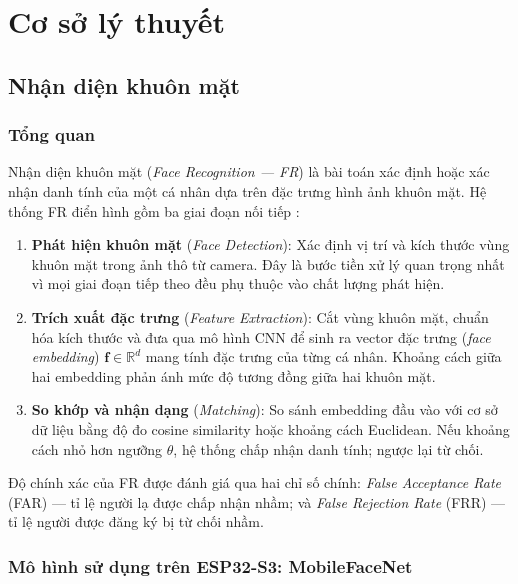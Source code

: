 \chapter{Cơ sở lý thuyết}
\label{chap:theory}

\section{Nhận diện khuôn mặt}
\label{sec:face_recognition}

\subsection{Tổng quan}

Nhận diện khuôn mặt (\textit{Face Recognition --- FR}) là bài toán xác định hoặc xác nhận danh tính của một cá nhân dựa trên đặc trưng hình ảnh khuôn mặt. Hệ thống FR điển hình gồm ba giai đoạn nối tiếp \cite{wang2021}:

\begin{enumerate}[label=\arabic*.]
  \item \textbf{Phát hiện khuôn mặt} (\textit{Face Detection}): Xác định vị trí và kích thước vùng khuôn mặt trong ảnh thô từ camera. Đây là bước tiền xử lý quan trọng nhất vì mọi giai đoạn tiếp theo đều phụ thuộc vào chất lượng phát hiện.
  \item \textbf{Trích xuất đặc trưng} (\textit{Feature Extraction}): Cắt vùng khuôn mặt, chuẩn hóa kích thước và đưa qua mô hình CNN để sinh ra vector đặc trưng (\textit{face embedding}) $\mathbf{f} \in \mathbb{R}^d$ mang tính đặc trưng của từng cá nhân. Khoảng cách giữa hai embedding phản ánh mức độ tương đồng giữa hai khuôn mặt.
  \item \textbf{So khớp và nhận dạng} (\textit{Matching}): So sánh embedding đầu vào với cơ sở dữ liệu bằng độ đo cosine similarity hoặc khoảng cách Euclidean. Nếu khoảng cách nhỏ hơn ngưỡng $\theta$, hệ thống chấp nhận danh tính; ngược lại từ chối.
\end{enumerate}

Độ chính xác của FR được đánh giá qua hai chỉ số chính: \textit{False Acceptance Rate} (FAR) --- tỉ lệ người lạ được chấp nhận nhầm; và \textit{False Rejection Rate} (FRR) --- tỉ lệ người được đăng ký bị từ chối nhầm.

\subsection{Mô hình sử dụng trên ESP32-S3: MobileFaceNet}


